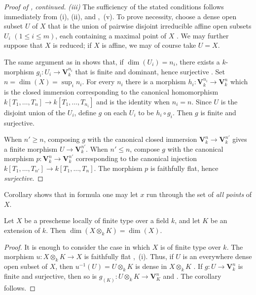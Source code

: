 \begin{proof}[Proof of , continued]
\emph{(iii)} The sufficiency of the stated conditions follows immediately from (i), (ii), and ,~(v).
To prove necessity, choose a dense open subset $U$ of $X$ that is the union of pairwise disjoint irreducible affine open subsets $U_i$ $(1\leq i\leq m)$, each containing a maximal point of $X$ .
We may further suppose that $X$ is reduced; if $X$ is affine, we may of course take $U=X$.


The same argument as in  shows that, if $\dim(U_i)=n_i$, there exists a $k$-morphism $g_i:U_i\longrightarrow\mathbf{V}_k^{n_i}$
that is finite and dominant, hence surjective .
Set $n=\dim(X)=\sup_i n_i$.
For every $n_i$ there is a morphism $h_i:\mathbf{V}_k^{n_i}\longrightarrow\mathbf{V}_k^n$
which is the closed immersion corresponding to the canonical homomorphism $k[T_1,\ldots,T_n]\longrightarrow k[T_1,\ldots,T_{n_i}]$
and is the identity when $n_i=n$.
Since $U$ is the disjoint union of the $U_i$, define $g$ on each $U_i$ to be $h_i\circ g_i$.
Then $g$ is finite and surjective.

When $n'\geq n$, composing $g$ with the canonical closed immersion $\mathbf{V}_k^n\longrightarrow\mathbf{V}_k^{n'}$
gives a finite morphism $U\to\mathbf{V}_k^{n'}$.
When $n'\leq n$, compose $g$ with the canonical morphism $p:\mathbf{V}_k^n\longrightarrow\mathbf{V}_k^{n'}$
corresponding to the canonical injection $k[T_1,\ldots,T_{n'}]\longrightarrow k[T_1,\ldots,T_n]$.
The morphism $p$ is faithfully flat, hence \emph{surjective}.
\end{proof}

\begin{remark}[4.1.3]
\label{IV.4.1.3}
Corollary  shows that in formula  one may let $x$ run through the set of \emph{all points} of $X$.
\end{remark}

\begin{corollary}[4.1.4]
\label{IV.4.1.4}
Let $X$ be a prescheme locally of finite type over a field $k$, and let $K$ be an extension of $k$.
Then $\dim(X\otimes_k K)=\dim(X)$.
\end{corollary}

\begin{proof}
It is enough to consider the case in which $X$ is of finite type over $k$.
The morphism $u:X\otimes_k K\longrightarrow X$
is faithfully flat ,~(i).
Thus, if $U$ is an everywhere dense open subset of $X$, then $u^{-1}(U)=U\otimes_k K$
is dense in $X\otimes_k K$ .
If $g:U\longrightarrow\mathbf{V}_k^n$
is finite and surjective, then so is $g_{(K)}:U\otimes_k K\longrightarrow\mathbf{V}_K^n$
 and .
The corollary follows.
\end{proof}

